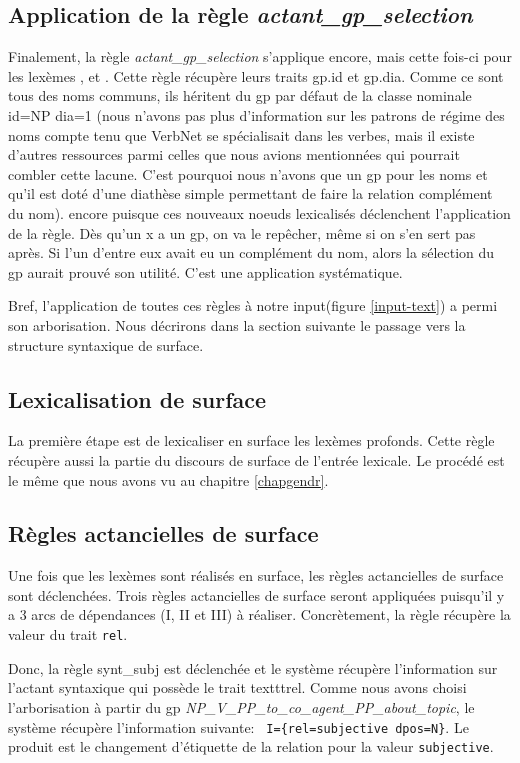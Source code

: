 \subsection{Application de la règle \emph{actant\_gp\_selection}}
Finalement, la règle \emph{actant\_gp\_selection} s'applique encore, mais cette fois-ci pour les lexèmes , et . Cette règle récupère leurs traits gp.id et gp.dia. Comme ce sont tous des noms communs, ils héritent du gp par défaut de la classe nominale id=NP dia=1 (nous n'avons pas plus d'information sur les patrons de régime des noms compte tenu que VerbNet se spécialisait dans les verbes, mais il existe d'autres ressources parmi celles que nous avions mentionnées qui pourrait combler cette lacune. C'est pourquoi nous n'avons que un gp pour les noms et qu'il est doté d'une diathèse simple permettant de faire la relation complément du nom). encore puisque ces nouveaux noe{}uds lexicalisés déclenchent l'application de la règle. Dès qu'un x a un gp, on va le repêcher, même si on s'en sert pas après. Si l'un d'entre eux avait eu un complément du nom, alors la sélection du gp aurait prouvé son utilité. C'est une application systématique.

Bref, l'application de toutes ces règles à notre input(figure \ref{input-text}) a permi son arborisation. Nous décrirons dans la section suivante le passage vers la structure syntaxique de surface.

\subsection{Lexicalisation de surface}
La première étape est de lexicaliser en surface les lexèmes profonds. Cette règle récupère aussi la partie du discours de surface de l'entrée lexicale. Le procédé est le même que nous avons vu au chapitre \ref{chapgendr}.

\subsection{Règles actancielles de surface}
Une fois que les lexèmes sont réalisés en surface, les règles actancielles de surface sont déclenchées. Trois règles actancielles de surface seront appliquées puisqu'il y a 3 arcs de dépendances (I, II et III) à réaliser. Concrètement, la règle récupère la valeur du trait \texttt{rel}. 

Donc, la règle synt\_subj est déclenchée et le système récupère l'information sur l'actant syntaxique qui possède le trait texttt{rel}. Comme nous avons choisi l'arborisation à partir du gp \emph{NP\_V\_PP\_to\_co\_agent\_PP\_about\_topic}, le système récupère l'information suivante: \lstinline! I={rel=subjective dpos=N}!. Le produit est le changement d'étiquette de la relation pour la valeur \texttt{subjective}.

